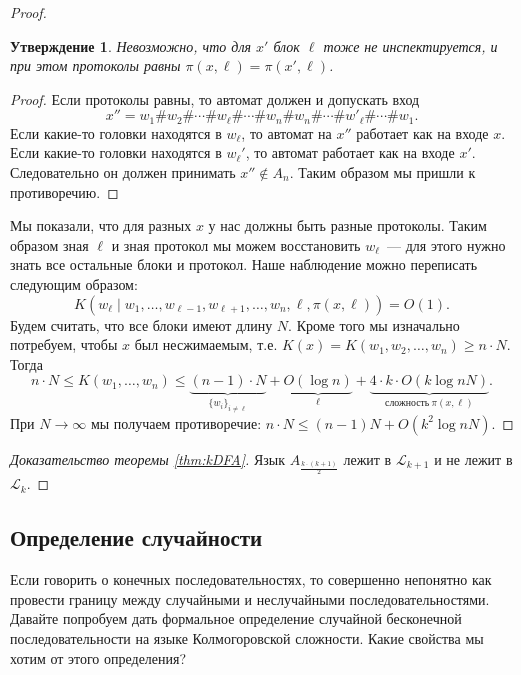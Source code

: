 \documentclass[12pt]{article}
\theoremstyle{definition}
\theoremstyle{plain}
\newtheorem{statement}{Утверждение}[section]
\theoremstyle{remark}
\begin{document}
\begin{proof}
    \begin{statement}
        Невозможно, что для $x'$ блок $\ell$ тоже не инспектируется, 
        и при этом протоколы равны $\pi(x,\ell) = \pi(x',\ell)$.
    \end{statement}
    \begin{proof}
        Если протоколы равны, то автомат должен и допускать вход 
        \[
        x'' = w_1\#w_2\#\dotsb\#w_\ell\#\dotsb\#w_n\#w_n\#\dotsb\#w'_\ell\#\dotsb\#w_1.
        \]                                         
    Если какие-то головки находятся в $w_\ell$, то автомат на $x''$
    работает как на входе $x$. Если какие-то головки находятся в 
    $w_\ell'$, то автомат работает как на входе $x'$. Следовательно он должен
    принимать $x''\not\in A_n$. Таким образом мы пришли к противоречию. 
    \end{proof}
    Мы показали, что для разных $x$ у нас должны быть разные протоколы. Таким
    образом зная $\ell$ и зная протокол мы можем восстановить $w_\ell$~--- для
    этого нужно знать все остальные блоки и протокол.
    Наше наблюдение можно переписать следующим образом:
    \[
        K(w_\ell\mid w_1,\dots,w_{\ell-1},w_{\ell+1},\dotsc,w_n,\ell,\pi(x,\ell)) 
        = O(1).
    \]
    Будем считать, что все блоки имеют длину $N$. Кроме того мы изначально 
    потребуем, чтобы $x$ был несжимаемым, т.е. $K(x) = K(w_1,w_2,\dotsc,w_n)\ge n\cdot N.$
    Тогда
    \[
        n\cdot N \le K(w_1,\dotsc,w_n) \le 
        \underbrace{(n-1)\cdot N}_{\{w_i\}_{i\neq \ell}} + 
        \underbrace{O(\log n)}_{\ell} + 
        \underbrace{4\cdot k\cdot O(k\log nN)}_{\text{сложность}\ \pi(x,\ell)}.
    \]
    При $N\to\infty$ мы получаем противоречие:  $n\cdot N\le (n-1)N + O(k^2\log nN)$.
\end{proof}
\begin{proof}[Доказательство теоремы \ref{thm:kDFA}]
    Язык $A_{\frac{k\cdot (k + 1)}{2}}$ лежит в $\mathcal L_{k+1}$ 
    и не лежит в $\mathcal L_k.$
\end{proof}

\subsection{Определение случайности}
Если говорить о конечных последовательностях, то совершенно непонятно как 
провести границу между случайными и неслучайными последовательностями. 
Давайте попробуем дать формальное определение
случайной бесконечной последовательности на языке Колмогоровской сложности. Какие свойства
мы хотим от этого определения?
\end{document}
